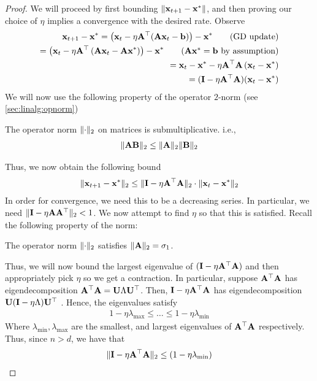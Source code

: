     \begin{proof}
    We will proceed by first bounding $\lVert \mathbf{x}_{t + 1} - \mathbf{x}^* \rVert$, and then proving our choice of $\eta$ implies a convergence with the desired rate. Observe
\begin{align*}
    \bx_{t+1} - \bx^* = \lp \bx_t - \eta\A^\top(\A\bx_t - {\bf b}) \rp - \bx^* \tag{GD update}\\
    = \lp \bx_t - \eta \A^\top \lp \A\bx_t - \A\bx^* \rp \rp - \bx^* \tag{$\A\bx^* = {\bf b}$ by assumption}\\
    = \bx_t - \bx^* - \eta \A^\top\A \lp \bx_t - \bx^* \rp \\
    = (\I - \eta \A^\top \A)(\bx_t - \bx^*)
\end{align*}
We will now use the following property of the operator $2$-norm (see \autoref{sec:linalg:opnorm})
\begin{prop}
    The operator norm $\lVert \cdot \rVert_2$ on matrices is submultiplicative. i.e.,
    \begin{align*}
        \lVert \mathbf{A} {\bf B} \rVert_2 \leq \lVert \mathbf{A} \rVert_2 \lVert {\bf B} \rVert_2
    \end{align*}
\end{prop}
Thus, we now obtain the following bound
\begin{align*}
    \lVert \mathbf{x}_{t + 1} - \mathbf{x}^* \rVert_2 \leq \lVert \mathbf{I} - \eta \mathbf{A}^\top\mathbf{A} \rVert_2 \cdot \lVert \mathbf{x}_t - \mathbf{x}^* \rVert_2
\end{align*}
In order for convergence, we need this to be a decreasing series. In particular, we need $\lVert \mathbf{I} - \eta \mathbf{A}\mathbf{A}^\top \rVert_2 < 1$. We now attempt to find $\eta$ so that this is satisfied.
Recall the following property of the norm:
\begin{prop}
    The operator norm $\lVert \cdot \rVert_2$ satisfies $\lVert \mathbf{A} \rVert_2 = \sigma_1$.
\end{prop}
Thus, we will now bound the largest eigenvalue of $(\mathbf{I} - \eta \mathbf{A}^\top\mathbf{A})$ and then appropriately pick $\eta$ so we get a contraction.
In particular, suppose $\mathbf{A}^\top \mathbf{A}$ has eigendecomposition $\mathbf{A}^\top\mathbf{A} = {\bf U} \Lambda {\bf U}^\top$.
Then, $\mathbf{I} - \eta\mathbf{A}^\top\mathbf{A}$ has eigendecomposition ${\bf U} (\mathbf{I} - \eta\Lambda) {\bf U}^\top$ .
Hence, the eigenvalues satisfy
\begin{align*}
    1 - \eta\lambda_{\max} \leq \dots \leq 1 - \eta\lambda_{\min}
\end{align*}
Where $\lambda_{\min}, \lambda_{\max}$ are the smallest, and largest eigenvalues of $\mathbf{A}^\top\mathbf{A}$ respectively.
Thus, since $n > d$, we have that $$\lVert \mathbf{I} - \eta \mathbf{A}^\top\mathbf{A} \rVert_2 \leq (1 - \eta \lambda_{\min})$$

\end{proof}
